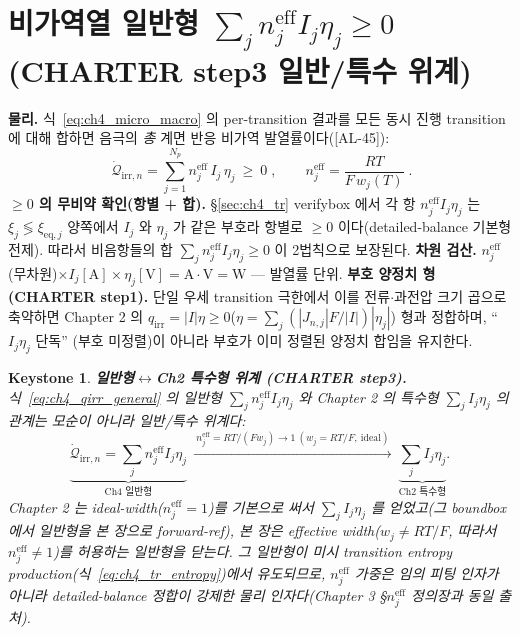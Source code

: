 \documentclass[11pt,a4paper]{article}
\newtheorem*{keybox}{Keystone}
\newcommand{\eff}{\mathrm{eff}}
\newcommand{\eq}{\mathrm{eq}}
\newcommand{\irr}{\mathrm{irr}}
\newcommand{\AL}[1]{\textsf{[AL-#1]}}
\begin{document}
\section{비가역열 일반형 $\sum_j n_j^{\eff}I_j\eta_j\ge0$ (CHARTER step3 일반/특수 위계)}\label{sec:ch4_general}
\textbf{물리.} 식~\eqref{eq:ch4_micro_macro} 의 per-transition 결과를 모든 동시 진행 transition 에 대해 합하면
음극의 \emph{총} 계면 반응 비가역 발열률이다(\AL{45}):
\begin{equation}
\boxed{\;\dot{\mathcal Q}_{\irr,n}=\sum_{j=1}^{N_p} n_j^{\eff}\,I_j\,\eta_j\ \ge\ 0\;,\qquad
n_j^{\eff}=\frac{RT}{F\,w_j(T)}\;.}
\label{eq:ch4_qirr_general}
\end{equation}
\textbf{$\ge0$ 의 무비약 확인(항별 + 합).} \S\ref{sec:ch4_tr} verifybox 에서 각 항 $n_j^{\eff}I_j\eta_j$ 는
$\xi_j\lessgtr\xi_{\eq,j}$ 양쪽에서 $I_j$ 와 $\eta_j$ 가 같은 부호라 항별로 $\ge0$ 이다(detailed-balance
기본형 전제). 따라서 비음항들의 합 $\sum_j n_j^{\eff}I_j\eta_j\ge0$ 이 2법칙으로 보장된다. \textbf{차원 검산.}
$n_j^{\eff}$(무차원)$\times I_j[\mathrm A]\times\eta_j[\mathrm V]=\mathrm{A\cdot V}=\mathrm W$ — 발열률 단위.
\textbf{부호 양정치 형(CHARTER step1).} 단일 우세 transition 극한에서 이를 전류$\cdot$과전압 크기 곱으로 축약하면
Chapter 2 의 $q_\irr=|I|\eta\ge0$($\eta=\sum_j(|J_{n,j}|F/|I|)|\eta_j|$) 형과 정합하며, ``$I_j\eta_j$ 단독''
(부호 미정렬)이 아니라 부호가 이미 정렬된 양정치 합임을 유지한다.

\begin{keybox}
\textbf{일반형$\leftrightarrow$Ch2 특수형 위계 (CHARTER step3).} 식~\eqref{eq:ch4_qirr_general} 의 \emph{일반형}
$\sum_j n_j^{\eff}I_j\eta_j$ 와 Chapter 2 의 \emph{특수형} $\sum_j I_j\eta_j$ 의 관계는 \emph{모순이 아니라
일반/특수 위계}다:
\begin{equation}
\underbrace{\dot{\mathcal Q}_{\irr,n}=\sum_j n_j^{\eff}I_j\eta_j}_{\text{Ch4 일반형}}
\ \xrightarrow{\ n_j^{\eff}=RT/(Fw_j)\to1\ (w_j=RT/F,\ \text{ideal})\ }\
\underbrace{\sum_j I_j\eta_j}_{\text{Ch2 특수형}}.
\label{eq:ch4_hierarchy}
\end{equation}
Chapter 2 는 ideal-width($n_j^{\eff}=1$)를 기본으로 써서 $\sum_j I_j\eta_j$ 를 얻었고(그 boundbox 에서 일반형을
본 장으로 forward-ref), 본 장은 effective width($w_j\ne RT/F$, 따라서 $n_j^{\eff}\ne1$)를 허용하는 일반형을
닫는다. 그 일반형이 미시 transition entropy production(식~\eqref{eq:ch4_tr_entropy})에서 유도되므로, $n_j^{\eff}$
가중은 임의 피팅 인자가 아니라 \emph{detailed-balance 정합이 강제한} 물리 인자다(Chapter 3 \S$n_j^{\eff}$
정의장과 동일 출처).
\end{keybox}
\end{document}
